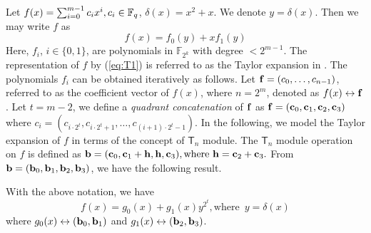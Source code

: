 Let $f(x) = \sum_{i=0}^{m-1}c_ix^i, c_i \in {\mathbb F}_{q}$, $\delta(x)=x^2+x$. We denote $y=\delta(x)$. Then  we may write $f$ as
\begin{equation}\label{eq:T1}
	f(x) = f_0(y) + x f_1(y)
\end{equation}
Here, $f_i$, $i \in \{0, 1\}$, are polynomials in $\mathbb{F}_{2^k}$ with degree $< 2^{m-1}$. The representation of $f$ by (\ref{eq:T1}) is referred to as the Taylor expansion in \cite{Gao2010FFT}. The polynomials $f_i$ can be obtained iteratively as follows. Let ${\bf{f}} = (c_0, \ldots, c_{n-1})$, referred to as the coefficient vector of $f(x)$, where $n = 2^m$, denoted as $f(x)\leftrightarrow {\bf{f}}$.   Let $t = {m-2}$, we define a \textit{quadrant concatenation} of  ${\bf{f}}$ as 
$
{\bf{f}} = ({\bf{c}}_0, {\bf{c}}_1, {\bf{c}}_2, {\bf{c}}_3)
$
where $c_i = (c_{i\cdot 2^{t}}, c_{i\cdot 2^{t} +1}, \ldots, c_{(i+1)\cdot 2^{t}-1})$.
In the following, we model the Taylor expansion of $f$ in terms of the concept of $\mathsf{T}_n$ module. 
The $\mathsf{T}_n$ module operation on $f$ is defined as
$
{\bf{b}} = ({\bf{c}}_0, {\bf{c}}_1+{\bf{h}}, {\bf{h}}, {\bf{c}}_3), \mbox{where } {\bf{h}}={\bf{c}}_2+{\bf{c}}_3.
$
From ${\bf{b}}=({\bf{b}}_0, {\bf{b}}_1, {\bf{b}}_2, {\bf{b}}_3)$, we have the following result.
\begin{lemma}\label{le:1}
	With the above notation, we have   
	\begin{equation}\label{eq:10}
		f(x) = g_0(x) + g_1(x)y^{2^t}, \mbox{where }\, y= \delta(x)     
	\end{equation}
	where $g_0(x) \leftrightarrow ({\bf{b}}_0, {\bf{b}}_1)$ and $g_1(x) \leftrightarrow ({\bf{b}}_2, {\bf{b}}_3)$.
	
\end{lemma}


